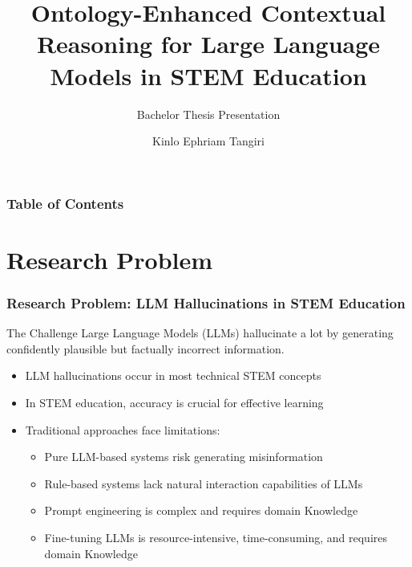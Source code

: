 \documentclass{beamer}
\title[Ontology-Enhanced LLMs] %
{Ontology-Enhanced Contextual Reasoning for Large Language Models in STEM Education}
\subtitle{Bachelor Thesis Presentation}
\author[Kinlo] %
{Kinlo Ephriam Tangiri}
\institute[Constructor University] %
{
  Department of Computer Science\\
  Constructor University\\
  \smallskip
  \small{Supervisor: Prof. Dr. Fatahi Valilai, Omid}
}
\date[May 2025] %
\begin{document}
\frame{\titlepage}

\begin{frame}
\frametitle{Table of Contents}
\tableofcontents
\end{frame}

\section{Research Problem}

\begin{frame}
\frametitle{Research Problem: LLM Hallucinations in STEM Education}

\begin{block}{The Challenge}
Large Language Models (LLMs) hallucinate a lot by generating confidently plausible but factually incorrect information.
\end{block}

\begin{itemize}
    \item<1-> LLM hallucinations occur in most technical STEM concepts
    \item<2-> In STEM education, accuracy is crucial for effective learning
    \item<3-> Traditional approaches face limitations:
    \begin{itemize}
        \item<3-> Pure LLM-based systems risk generating misinformation
        \item<3-> Rule-based systems lack natural interaction capabilities of LLMs
        \item<3-> Prompt engineering is complex and requires domain Knowledge
        \item<3-> Fine-tuning LLMs is resource-intensive, time-consuming, and requires domain Knowledge
    \end{itemize}
\end{itemize}
\end{frame}
\end{document}

